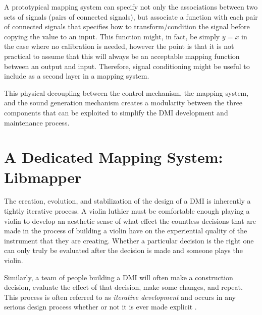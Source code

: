 A prototypical mapping system can specify not only the associations between two sets of signals (pairs of connected signals), but associate a function with each pair of connected signals that specifies how to transform/condition the signal before copying the value to an input. This function might, in fact, be simply \begin{math}y = x\end{math} in the case where no calibration is needed, however the point is that it is not practical to assume that this will always be an acceptable mapping function between an output and input. Therefore, signal conditioning might be useful to include as a second layer in a mapping system.

This physical decoupling between the control mechanism, the mapping system, and the sound generation mechanism creates a modularity between the three components that can be exploited to simplify the DMI development and maintenance process.

\section{A Dedicated Mapping System: Libmapper}

The creation, evolution, and stabilization of the design of a DMI is inherently a tightly iterative process. A violin luthier must be comfortable enough playing a violin to develop an aesthetic sense of what effect the countless decisions that are made in the process of building a violin have on the experiential quality of the instrument that they are creating. Whether a particular decision is the right one can only truly be evaluated after the decision is made and someone plays the violin. 

Similarly, a team of people building a DMI will often make a construction decision, evaluate the effect of that decision, make some changes, and repeat. This process is often referred to as \emph{iterative development} and occurs in any serious design process whether or not it is ever made explicit \cite{iterative2003}. 

